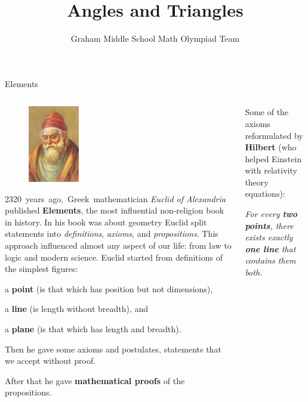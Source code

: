 \documentclass[9pt,aspectratio=169]{beamer}
\title{Angles and Triangles}
\subtitle[Graham Middle School]{Graham Middle School Math Olympiad Team}
\begin{document}
\maketitle

\begin{frame}{Elements}
  \begin{columns}[T]
    \begin{column}{0.5\textwidth}
      \begin{figure}
        \vspace*{-1.2\baselineskip}
        \hspace*{-1em}
        \includegraphics[width=0.28\textwidth]{10 - Angles and Triangles/euclid.jpg}
      \end{figure}
      2320~years~ago,~Greek~mathematician \emph{Euclid of Alexandria} published \textbf{Elements}, the most influential non-religion book in history. In his book was about geometry Euclid split statements into \emph{definitions}, \emph{axioms}, and \emph{propositions}. This approach influenced almost any aspect of our life: from law to logic and modern science. Euclid started from definitions of the simplest figures: 
      \begin{definition}
        a \textbf{point} (is that which has position but not dimensions), 
        
        a \textbf{line} (is length without breadth), and 
        
        a \textbf{plane} (is that which has length and breadth).
      \end{definition}
      Then he gave some axioms and postulates, statements that we accept without proof.

      After that he gave \textbf{mathematical proofs} of the propositions.
    \end{column}
    \begin{column}{0.5\textwidth}
      Some of the axioms reformulated by \textbf{Hilbert} (who helped Einstein with relativity theory equations):
      \begin{definition}
        \emph{For every \textbf{two points}, there exists exactly \textbf{one line} that contains them both.} 
        

\end{definition}
\end{column}
\end{columns}
\end{frame}
\end{document}
